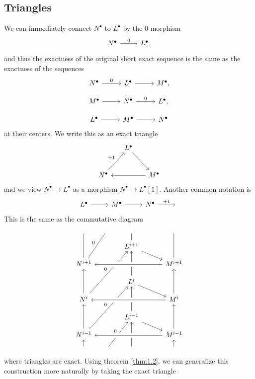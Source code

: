 \subsection{Triangles}
We can immediately connect $N^\bullet $ to $L^\bullet $ by the 0 morphism
\[\begin{tikzcd}[row sep = 2.5em, column sep = 2.5em]
	N^\bullet \ar[r, "0"]&L^\bullet ,
\end{tikzcd}\]
and thus the exactness of the original short exact sequence is the same as the exactness of the sequences
\[\begin{tikzcd}[row sep = 1em, column sep = 2.5em]
	N^\bullet \ar[r, "0"]&L^\bullet \ar[r]&M^\bullet ,\\
	M^\bullet \ar[r]&N^\bullet \ar[r, "0"]&L^\bullet ,\\
	L^\bullet \ar[r]&M^\bullet \ar[r]&N^\bullet 
\end{tikzcd}\]
at their centers. We write this as an exact triangle
\[\begin{tikzcd}[row sep = 2.5em, column sep = 1.5em]
	&L^\bullet \ar[dr]\\
	N^\bullet \ar[ur, "+1"]&&M^\bullet\ar[ll] 
\end{tikzcd}\]
and we view $N^\bullet \to L^\bullet $ as a morphism $N^\bullet \to L^\bullet [1]$. Another common notation is
\[\begin{tikzcd}[row sep = 2.5em, column sep = 2.5em]
	L^\bullet \ar[r]&M^\bullet \ar[r]&N^\bullet \ar[r, "+1"]&{}
\end{tikzcd}\]
This is the same as the commutative diagram
\[\begin{tikzcd}[row sep = 1em, column sep = 1.5em]
	\,& {} &\, &&\, \\
	  && L^{i+1}\ar[u, dash]\ar[drr] && \\
	N^{i+1}\ar[uu, dash]\ar[uur, dash, "0"] && && M^{i+1}\ar[uu,  dash]  \\
			     && L^{i}\ar[uu]\ar[drr] && \\
	N^{i}\ar[uu]\ar[uuurr, "0"] && && M^{i}\ar[uu] \\
			       && L^{i-1}\ar[uu]\ar[drr] && \\
	N^{i-1}\ar[uuurr, "0"]\ar[uu] && &&M^{i-1}\ar[uu] \\
	\,\ar[u] &{}\ar[uur, "0"]& \,\ar[uu] && \,\ar[u]
	\arrow[from=7-5, to=7-1, crossing over]
	\arrow[from=5-5, to=5-1, crossing over]
	\arrow[from=3-5, to=3-1, crossing over]
\end{tikzcd}\]
where triangles are exact. Using theorem \ref{thm:1.2}, we can generalize this construction more naturally by taking the exact triangle
